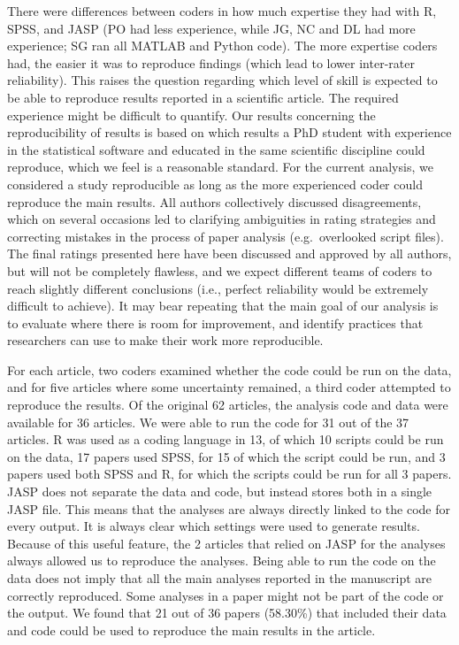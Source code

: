 \documentclass[
  ,jou, a4paper,floatsintext]{apa6}
\begin{document}
There were differences between coders in how much expertise they had with R, SPSS, and JASP (PO had less experience, while JG, NC and DL had more experience; SG ran all MATLAB and Python code). The more expertise coders had, the easier it was to reproduce findings (which lead to lower inter-rater reliability). This raises the question regarding which level of skill is expected to be able to reproduce results reported in a scientific article. The required experience might be difficult to quantify. Our results concerning the reproducibility of results is based on which results a PhD student with experience in the statistical software and educated in the same scientific discipline could reproduce, which we feel is a reasonable standard. For the current analysis, we considered a study reproducible as long as the more experienced coder could reproduce the main results. All authors collectively discussed disagreements, which on several occasions led to clarifying ambiguities in rating strategies and correcting mistakes in the process of paper analysis (e.g.~overlooked script files). The final ratings presented here have been discussed and approved by all authors, but will not be completely flawless, and we expect different teams of coders to reach slightly different conclusions (i.e., perfect reliability would be extremely difficult to achieve). It may bear repeating that the main goal of our analysis is to evaluate where there is room for improvement, and identify practices that researchers can use to make their work more reproducible.

For each article, two coders examined whether the code could be run on the data, and for five articles where some uncertainty remained, a third coder attempted to reproduce the results. Of the original 62 articles, the analysis code and data were available for 36 articles. We were able to run the code for 31 out of the 37 articles. R was used as a coding language in 13, of which 10 scripts could be run on the data, 17 papers used SPSS, for 15 of which the script could be run, and 3 papers used both SPSS and R, for which the scripts could be run for all 3 papers. JASP does not separate the data and code, but instead stores both in a single JASP file. This means that the analyses are always directly linked to the code for every output. It is always clear which settings were used to generate results. Because of this useful feature, the 2 articles that relied on JASP for the analyses always allowed us to reproduce the analyses. Being able to run the code on the data does not imply that all the main analyses reported in the manuscript are correctly reproduced. Some analyses in a paper might not be part of the code or the output. We found that 21 out of 36 papers (58.30\%) that included their data and code could be used to reproduce the main results in the article.
\end{document}
